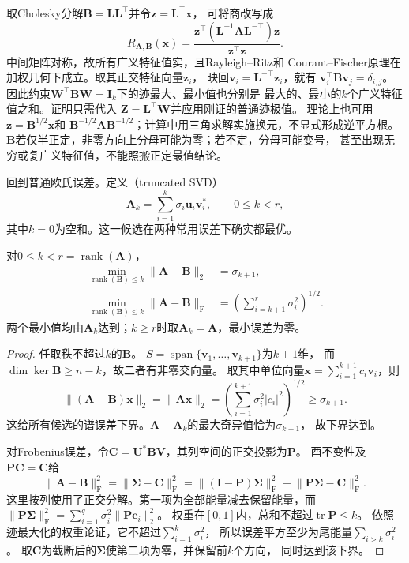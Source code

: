 取Cholesky分解$\bm B=\bm L\bm L^\top$并令$\bm z=\bm L^\top\bm x$，
可将商改写成
\[
 R_{\bm A,\bm B}(\bm x)
 =\frac{\bm z^\top(\bm L^{-1}\bm A\bm L^{-\top})\bm z}
        {\bm z^\top\bm z}.
\]
中间矩阵对称，故所有广义特征值实，且Rayleigh--Ritz和
Courant--Fischer原理在加权几何下成立。取其正交特征向量$\bm z_i$，
映回$\bm v_i=\bm L^{-\top}\bm z_i$，就有
$\bm v_i^\top\bm B\bm v_j=\delta_{i,j}$。
因此约束$\bm W^\top\bm B\bm W=\bm I_k$下的迹最大、最小值也分别是
最大的、最小的$k$个广义特征值之和。证明只需代入
$\bm Z=\bm L^\top\bm W$并应用刚证的普通迹极值。
理论上也可用$\bm z=\bm B^{1/2}\bm x$和
$\bm B^{-1/2}\bm A\bm B^{-1/2}$；计算中用三角求解实施换元，不显式形成逆平方根。
$\bm B$若仅半正定，非零方向上分母可能为零；若不定，分母可能变号，
甚至出现无穷或复广义特征值，不能照搬正定最值结论。

回到普通欧氏误差。定义（truncated SVD）
\begin{equation}
 \bm A_k=\sum_{i=1}^k\sigma_i\bm u_i\bm v_i^*,\qquad 0\leq k<r,
 \label{eq:matrix-analysis-truncated-svd}
\end{equation}
其中$k=0$为空和。这一候选在两种常用误差下确实都最优。
\begin{theorem}
\label{thm:matrix-analysis-best-low-rank}
对$0\leq k<r=\operatorname{rank}(\bm A)$，
\begin{align}
 \min_{\operatorname{rank}(\bm B)\leq k}\lVert\bm A-\bm B\rVert_2
 &=\sigma_{k+1},
 \label{eq:matrix-analysis-best-rank-k-spectral}\\
 \min_{\operatorname{rank}(\bm B)\leq k}\lVert\bm A-\bm B\rVert_{\mathrm F}
 &=\left(\sum_{i=k+1}^r\sigma_i^2\right)^{1/2}.
 \label{eq:matrix-analysis-best-rank-k-frobenius}
\end{align}
两个最小值均由$\bm A_k$达到；$k\geq r$时取$\bm A_k=\bm A$，最小误差为零。
\end{theorem}
\begin{proof}
任取秩不超过$k$的$\bm B$。
$S=\operatorname{span}\{\bm v_1,\ldots,\bm v_{k+1}\}$为$k+1$维，
而$\dim\ker\bm B\geq n-k$，故二者有非零交向量。
取其中单位向量$\bm x=\sum_{i=1}^{k+1}c_i\bm v_i$，则
\[
 \lVert(\bm A-\bm B)\bm x\rVert_2
 =\lVert\bm A\bm x\rVert_2
 =\left(\sum_{i=1}^{k+1}\sigma_i^2|c_i|^2\right)^{1/2}
 \geq\sigma_{k+1}.
\]
这给所有候选的谱误差下界。$\bm A-\bm A_k$的最大奇异值恰为$\sigma_{k+1}$，
故下界达到。

对Frobenius误差，令$\bm C=\bm U^*\bm B\bm V$，其列空间的正交投影为$\bm P$。
酉不变性及$\bm P\bm C=\bm C$给
\[
 \lVert\bm A-\bm B\rVert_{\mathrm F}^2
 =\lVert\bm\Sigma-\bm C\rVert_{\mathrm F}^2
 =\lVert(\bm I-\bm P)\bm\Sigma\rVert_{\mathrm F}^2
  +\lVert\bm P\bm\Sigma-\bm C\rVert_{\mathrm F}^2.
\]
这里按列使用了正交分解。第一项为全部能量减去保留能量，而
$\lVert\bm P\bm\Sigma\rVert_{\mathrm F}^2
=\sum_{i=1}^q\sigma_i^2\lVert\bm P\bm e_i\rVert_2^2$。
权重在$[0,1]$内，总和不超过$\operatorname{tr}\bm P\leq k$。
依照迹最大化的权重论证，它不超过$\sum_{i=1}^k\sigma_i^2$，
所以误差平方至少为尾能量$\sum_{i>k}\sigma_i^2$。
取$\bm C$为截断后的$\bm\Sigma$使第二项为零，并保留前$k$个方向，
同时达到该下界。
\end{proof}


